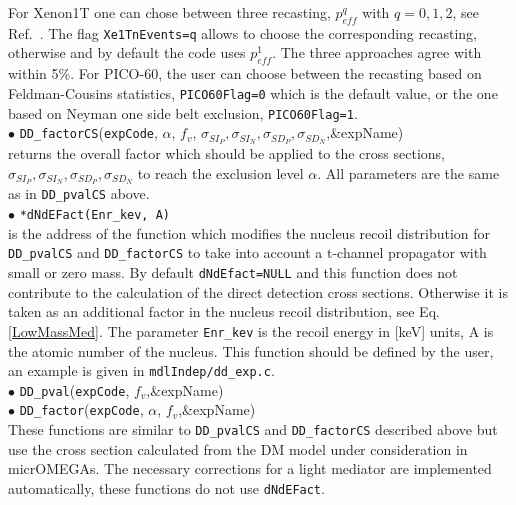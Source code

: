 \documentclass[12pt,a4paper]{article}
\begin{document}
For  Xenon1T one can chose  between  three recasting, $p_{eff}^{q}$ with $q=0,1,2$, 
see Ref.~\cite{Belanger:2020gnr}. The  flag {\tt Xe1TnEvents=q} allows to choose the  corresponding recasting,  otherwise and by default the code uses  $p_{eff}^1$. The three approaches agree with within 5\%. For PICO-60, the user can choose between the recasting based on Feldman-Cousins statistics, {\tt PICO60Flag=0} 
which is the default value, or the one based on  Neyman one side belt exclusion, {\tt PICO60Flag=1}.\\ 



\noindent
$\bullet$ \verb|DD_factorCS|(\verb|expCode|, $\alpha$, $f_v$, $\sigma_{SI_P},\sigma_{SI_N},\sigma_{SD_P},\sigma_{SD_N}$,\&expName)\\ 
returns the overall factor which should be applied to the cross sections, $\sigma_{SI_P},\sigma_{SI_N},\sigma_{SD_P}, \sigma_{SD_N}$ to reach  the exclusion level $\alpha$.  
All parameters are the same as in {\tt DD\_pvalCS} above. \\

\noindent
$\bullet$ \verb|*dNdEFact(Enr_kev, A)|\\
is the address of the function which modifies the nucleus recoil distribution  for {\tt DD\_pvalCS}
and {\tt DD\_factorCS}   to take into account a 
t-channel propagator  with  small or zero mass.  By default \verb|dNdEfact=NULL| and this 
function does not contribute to  the calculation of the direct detection cross sections. Otherwise  it is taken as an additional factor 
in the nucleus recoil distribution, see Eq.\ref{LowMassMed}.  
The parameter {\tt Enr\_kev} is the recoil energy in [keV] units, A is the  atomic number of the nucleus. This function should be defined by the user, an example is given in 
\verb|mdlIndep/dd_exp.c|.\\

\noindent
$\bullet$ \verb|DD_pval|(\verb|expCode|, $f_v$,\&expName)\\
$\bullet$  \verb|DD_factor|(\verb|expCode|, $\alpha$, $f_v$,\&expName)\\     
These functions are similar to  \verb|DD_pvalCS| and \verb|DD_factorCS| described above but use the  cross section calculated from the DM model under consideration in 
micrOMEGAs.  The necessary corrections for a light mediator are implemented automatically, these functions do not use {\tt dNdEFact}. \\
\end{document}
